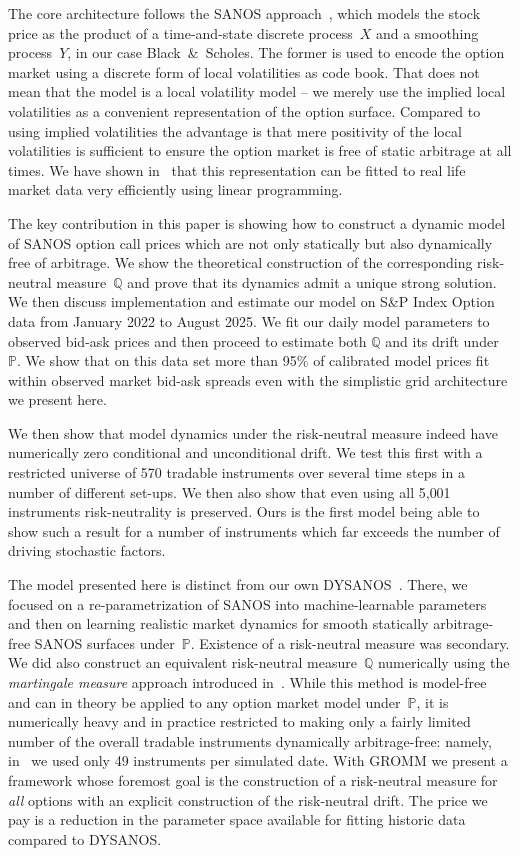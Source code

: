 \documentclass[smallextended,envcountsame,envcountsect]{svjour3}
\newcommand{\Q}{\mathbb Q}
\newcommand{\PP}{\mathbb P}
\begin{document}
The core architecture follows the SANOS approach~\citep{SANOS2026}, which models the stock price as the product
of a time-and-state discrete process~$X$ and a smoothing process~$Y$, in our case Black~\&~Scholes.
The former is used to encode the option market using a discrete form of local volatilities as code book. That does not mean
that the model is a local volatility model -- we merely use the implied local volatilities as a convenient representation of the option surface.
Compared to using implied volatilities the advantage is that mere positivity of the local volatilities is sufficient to ensure
the option market is free of static arbitrage at all times. We have shown in~\citet{SANOS2026} that this representation
can be fitted to real life market data very efficiently using linear programming.

The key contribution in this paper is showing how to construct a dynamic model of SANOS option call prices which are not only statically but
also dynamically free of arbitrage. We show the theoretical construction of the corresponding risk-neutral measure~$\mathbb{Q}$
and prove that its dynamics admit a unique strong solution. We then discuss implementation
and estimate our model on S\&P Index Option data from January 2022 to August 2025. We fit our daily model parameters to observed bid-ask prices and then proceed to
estimate both $\Q$ and its drift under $\PP$. We show that
on this data set more than 95\% of calibrated
model prices fit within observed market bid-ask spreads even with the simplistic grid architecture we present here.

We then show that model dynamics under the risk-neutral measure indeed have numerically zero conditional and unconditional drift. We test this first
with a restricted universe of 570 tradable instruments over several time steps in a number of different set-ups. We then also show that even using all 5{,}001 instruments
 risk-neutrality is preserved. Ours is the first model being able to show such a result for a number of instruments which far exceeds
the number of driving stochastic factors.

The model presented here is distinct from our own DYSANOS~\citep{DYSANOS2026}. There, we focused on a re-parametrization of SANOS into machine-learnable parameters
and then on learning
realistic market dynamics for smooth statically arbitrage-free SANOS
surfaces under~$\PP$. Existence of a risk-neutral measure was secondary.
We did also construct an equivalent risk-neutral measure~$\Q$ numerically using the \emph{martingale measure} approach introduced in~\citet{removedrift}.
While this method is model-free and can in theory be applied to any option market model under~$\PP$, it is numerically heavy and in practice
restricted to making only a fairly limited number of the overall tradable instruments
dynamically arbitrage-free: namely, in~\citet{DYSANOS2026} we used only 49 instruments per simulated date.
With GROMM we present a framework whose foremost goal is the construction of a risk-neutral measure for \emph{all} options with
an explicit construction of the risk-neutral drift. The price we pay is a reduction
in the parameter space available for fitting historic data compared to DYSANOS.
\end{document}
